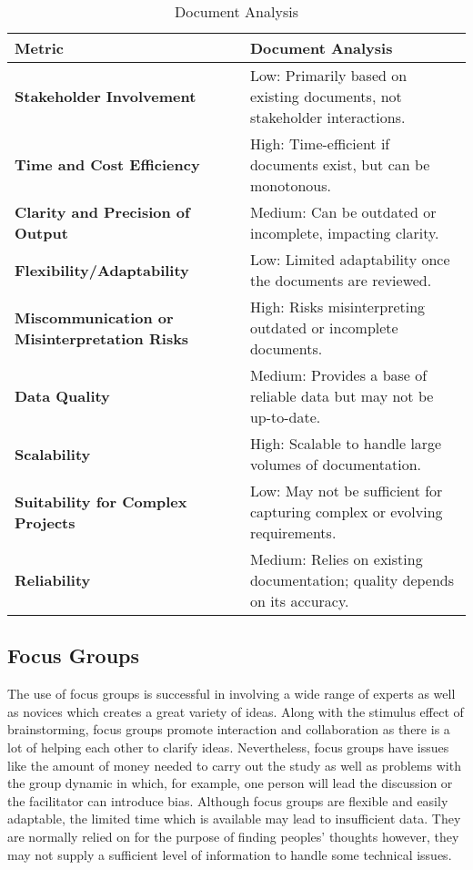\documentclass[conference]{IEEEtran}
\begin{document}
\begin{table}[htbp]
\caption{Document Analysis}
\label{tab5}
\centering
\begin{tabular}{|p{4cm}|p{4cm}|}
\hline
\textbf{Metric}                     & \textbf{Document Analysis}                                    \\ \hline
\textbf{Stakeholder Involvement}     & Low: Primarily based on existing documents, not stakeholder interactions. \\ \hline
\textbf{Time and Cost Efficiency}    & High: Time-efficient if documents exist, but can be monotonous. \\ \hline
\textbf{Clarity and Precision of Output} & Medium: Can be outdated or incomplete, impacting clarity.    \\ \hline
\textbf{Flexibility/Adaptability}    & Low: Limited adaptability once the documents are reviewed.    \\ \hline
\textbf{Miscommunication or Misinterpretation Risks} & High: Risks misinterpreting outdated or incomplete documents.  \\ \hline
\textbf{Data Quality}                    & Medium: Provides a base of reliable data but may not be up-to-date. \\ \hline
\textbf{Scalability}                     & High: Scalable to handle large volumes of documentation.      \\ \hline
\textbf{Suitability for Complex Projects} & Low: May not be sufficient for capturing complex or evolving requirements. \\ \hline
\textbf{Reliability}                     & Medium: Relies on existing documentation; quality depends on its accuracy. \\ \hline
\end{tabular}
\end{table}

\subsection*{Focus Groups}
The use of focus groups is successful in involving a wide range of experts as well as novices which creates a great variety of ideas. Along with the stimulus effect of brainstorming, focus groups promote interaction and collaboration as there is a lot of helping each other to clarify ideas. Nevertheless, focus groups have issues like the amount of money needed to carry out the study as well as problems with the group dynamic in which, for example, one person will lead the discussion or the facilitator can introduce bias. Although focus groups are flexible and easily adaptable, the limited time which is available may lead to insufficient data. They are normally relied on for the purpose of finding peoples' thoughts however, they may not supply a sufficient level of information to handle some technical issues.
\end{document}
